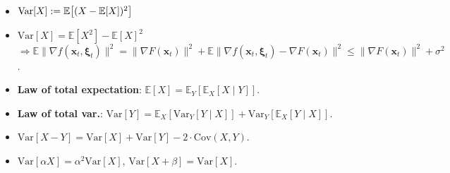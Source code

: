\documentclass[a4paper]{article}
\newcommand{\lft}{\mathopen{}\mathclose\bgroup\left}
\newcommand{\rgt}{\aftergroup\egroup\right}
\newcommand{\E}{\mathbb{E}}
\newcommand{\Var}{\mathrm{Var}}
\renewcommand{\vec}[1]{\mathbf{#1}}
\newenvironment{topic}[1]
{\textbf{\sffamily \colorbox{black}{\rlap{\textbf{\textcolor{white}{#1}}}\hspace{\linewidth}\hspace{-2\fboxsep}}} \\ \vspace{0.2cm}}
{}
\begin{document}
\begin{multicols*}{2}
    \begin{topic}{Expectation and variance for SGD}
        \begin{itemize}
            \item $\Var[X] := \E\lft[ (X - \E[X])^2 \rgt]$
            \item $\Var[X] = \E[X^2] - \E[X]^2$ \\ $\Rightarrow \E \| \nabla f(\vec{x}_t, \vec{\xi}_t) \|^2 = \| \nabla F(\vec{x}_t) \|^2 + \E \| \nabla f(\vec{x}_t, \vec{\xi}_t) - \nabla F(\vec{x}_t) \|^2 \leq \| \nabla F(\vec{x}_t) \|^2 + \sigma^2$.
            \item \textbf{Law of total expectation}: $\E[X] = \E_Y[\E_X[X \mid Y]]$.
            \item \textbf{Law of total var.}: $\Var[Y] = \E_X[\Var_Y[Y \mid X]] + \Var_Y[\E_X[Y \mid X]]$.
            \item $\Var[X-Y] = \Var[X] + \Var[Y] - 2 \cdot \mathrm{Cov}(X, Y)$.
            \item $\Var[\alpha X] = \alpha^2 \Var[X]$, $\Var[X + \beta] = \Var[X]$.
        \end{itemize}
    \end{topic}

    \begin{topic}{Risk minimization}

    \end{topic}

    \begin{topic}{Non-linear programming}

    \end{topic}


\end{multicols*}
\end{document}
